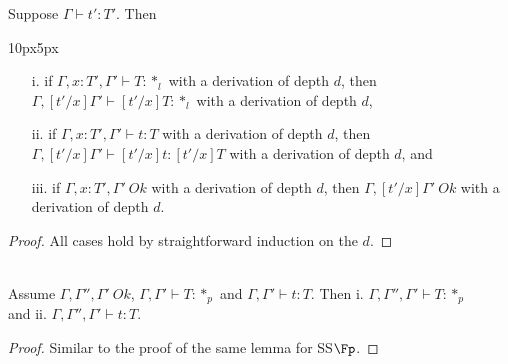 \begin{lemma}
  \label{lemma:term_substitution_for_kinding_context_ok_ssfe}
  Suppose $\Gamma \vdash t':T'$.  Then
  \vspace{-25px}
  \begin{changemargin}{10px}{5px}\noindent
  \begin{itemize}
  \item[i.] if $\Gamma,x:T',\Gamma' \vdash T:*_l$ with a
    derivation of depth $d$, then $\Gamma,[t'/x]\Gamma' \vdash
    [t'/x]T:*_l$ with a derivation of depth $d$,
  \item[ii.] if $\Gamma, x:T',\Gamma' \vdash t:T$ with a 
    derivation of depth $d$, then $\Gamma,[t'/x]\Gamma' \vdash [t'/x]t:[t'/x]T$ 
    with a derivation of depth $d$, and
  \item[iii.] if $\Gamma,x:T',\Gamma'\ Ok$ with a derivation of depth $d$, then 
    $\Gamma,[t'/x]\Gamma'\ Ok$ with a derivation of depth $d$.
  \end{itemize}
  \end{changemargin}
\end{lemma}
\begin{proof}
  All cases hold by straightforward induction on the $d$.
\end{proof}

\begin{lemma}
  \label{lemma:context_weakening_for_kinding_and_typing_ssfe}
  \,\\Assume $\Gamma,\Gamma'',\Gamma'\ Ok$, $\Gamma,\Gamma' \vdash T:*_p$ and 
  $\Gamma,\Gamma' \vdash t:T$.  Then i. $\Gamma,\Gamma'',\Gamma'
  \vdash T:*_p$ \\ and ii. $\Gamma,\Gamma'',\Gamma' \vdash t:T$. 
\end{lemma}
\begin{proof}
  Similar to the proof of the same lemma for SS$\Fp$.
\end{proof}

